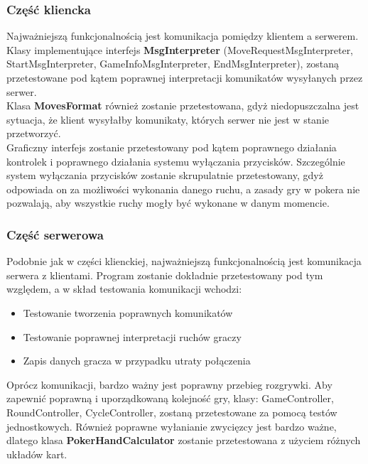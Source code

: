 \documentclass{article}
\begin{document}
        \subsubsection{Część kliencka}
            Najważniejszą funkcjonalnością jest komunikacja pomiędzy klientem a serwerem.
            Klasy implementujące interfejs \textbf{MsgInterpreter}
                (MoveRequestMsgInterpreter, StartMsgInterpreter, GameInfoMsgInterpreter, EndMsgInterpreter),
            zostaną przetestowane pod kątem poprawnej interpretacji komunikatów wysyłanych przez serwer.\\
            Klasa \textbf{MovesFormat} również zostanie przetestowana, gdyż niedopuszczalna jest sytuacja, że klient wysyłałby komunikaty, których serwer nie jest w stanie przetworzyć.
            \\
            Graficzny interfejs zostanie przetestowany pod kątem poprawnego działania kontrolek i poprawnego działania systemu wyłączania przycisków.
            Szczególnie system wyłączania przycisków zostanie skrupulatnie przetestowany, gdyż odpowiada on za możliwości wykonania danego ruchu, a zasady gry w pokera nie pozwalają, aby wszystkie ruchy mogły być wykonane w danym momencie.
                
        \subsubsection{Część serwerowa}
            Podobnie jak w części klienckiej, najważniejszą funkcjonalnością jest komunikacja serwera z klientami.
            Program zostanie dokładnie przetestowany pod tym względem, a w skład testowania komunikacji wchodzi:
            \begin{itemize}
                \item Testowanie tworzenia poprawnych komunikatów
                \item Testowanie poprawnej interpretacji ruchów graczy
                \item Zapis danych gracza w przypadku utraty połączenia
            \end{itemize}
            Oprócz komunikacji, bardzo ważny jest poprawny przebieg rozgrywki.
            Aby zapewnić poprawną i uporządkowaną kolejność gry, klasy: GameController, RoundController, CycleController, zostaną przetestowane za pomocą testów jednostkowych.
            Również poprawne wyłanianie zwycięzcy jest bardzo ważne, dlatego klasa \textbf{PokerHandCalculator} zostanie przetestowana z użyciem różnych układów kart.
\end{document}
